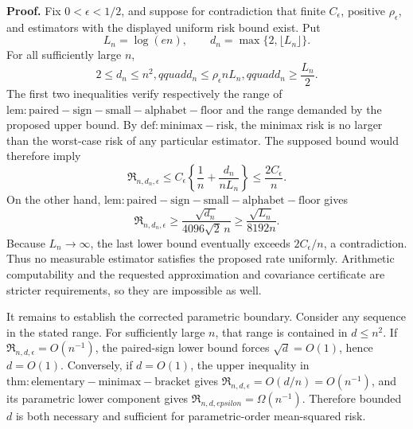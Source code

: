\textbf{Proof.}
Fix \(0<\epsilon<1/2\), and suppose for contradiction that finite \(C_\epsilon\), positive \(\rho_\epsilon\), and estimators with the displayed uniform risk bound exist.  Put
\[
 L_n=\log(en),\qquad d_n=\max\{2,\lfloor L_n\rfloor\}.
\]
For all sufficiently large \(n\),
\[
 2\le d_n\le n^2,qquad
 d_n\le\rho_\epsilon nL_n,qquad
 d_n\ge\frac{L_n}{2}.
\]
The first two inequalities verify respectively the range of \(\mathrm{lem:paired-sign-small-alphabet-floor}\) and the range demanded by the proposed upper bound.  By \(\mathrm{def:minimax-risk}\), the minimax risk is no larger than the worst-case risk of any particular estimator.  The supposed bound would therefore imply
\[
 \mathfrak R_{n,d_n,\epsilon}
 \le C_\epsilon\left\{\frac1n+\frac{d_n}{nL_n}\right\}
 \le\frac{2C_\epsilon}{n}.
\]
On the other hand, \(\mathrm{lem:paired-sign-small-alphabet-floor}\) gives
\[
 \mathfrak R_{n,d_n,\epsilon}
 \ge\frac{\sqrt{d_n}}{4096\sqrt2\,n}
 \ge\frac{\sqrt{L_n}}{8192n}.
\]
Because \(L_n\to\infty\), the last lower bound eventually exceeds \(2C_\epsilon/n\), a contradiction.  Thus no measurable estimator satisfies the proposed rate uniformly.  Arithmetic computability and the requested approximation and covariance certificate are stricter requirements, so they are impossible as well.

It remains to establish the corrected parametric boundary.  Consider any sequence in the stated range.  For sufficiently large \(n\), that range is contained in \(d\le n^2\).  If \(\mathfrak R_{n,d,\epsilon}=O(n^{-1})\), the paired-sign lower bound forces \(\sqrt d=O(1)\), hence \(d=O(1)\).  Conversely, if \(d=O(1)\), the upper inequality in \(\mathrm{thm:elementary-minimax-bracket}\) gives \(\mathfrak R_{n,d,\epsilon}=O(d/n)=O(n^{-1})\), and its parametric lower component gives \(\mathfrak R_{n,d,epsilon}=\Omega(n^{-1})\).  Therefore bounded \(d\) is both necessary and sufficient for parametric-order mean-squared risk.